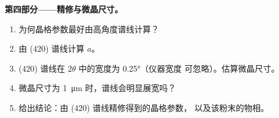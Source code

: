 \begin{problem}
\medskip\noindent\textbf{第四部分——精修与微晶尺寸。}
\begin{enumerate}[resume]
  \item 为何晶格参数最好由高角度谱线计算？
  \item 由 (420) 谱线计算 $a$。
  \item (420) 谱线在 $2\theta$ 中的宽度为 \ang{0.25}（仪器宽度
        可忽略）。估算微晶尺寸。
  \item 微晶尺寸为 \qty{1}{\micro m} 时，谱线会明显展宽吗？
  \item 给出结论：由 (420) 谱线精修得到的晶格参数，
        以及该粉末的物相。
\end{enumerate}
\end{problem}
